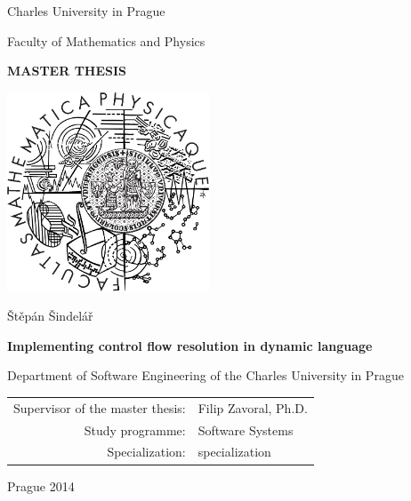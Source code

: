 \documentclass[12pt,a4paper]{report}
\begin{document}
\newcommand{\wthesis}[0]{thesis}
\newcommand{\wThesis}[0]{Thesis}

\newcommand{\wchapter}[0]{chapter}
\newcommand{\wChapter}[0]{Chapter}

\newcommand{\wsection}[0]{section}
\newcommand{\wSection}[0]{Section}



\pagestyle{empty}
\begin{center}

\large

Charles University in Prague

\medskip

Faculty of Mathematics and Physics

\vfill

{\bf\Large MASTER THESIS}

\vfill

\centerline{\mbox{\includegraphics[width=60mm]{img/logo.pdf}}}

\vfill
\vspace{5mm}

{\LARGE Štěpán Šindelář}

\vspace{15mm}

{\LARGE\bfseries Implementing control flow resolution in dynamic language}

\vfill

Department of Software Engineering of the Charles University in Prague

\vfill

\begin{tabular}{rl}

Supervisor of the master thesis: & Filip Zavoral, Ph.D. \\
\noalign{\vspace{2mm}}
Study programme: & Software Systems \\
\noalign{\vspace{2mm}}
Specialization: & specialization \\
\end{tabular}

\vfill

Prague 2014

\end{center}
\end{document}
